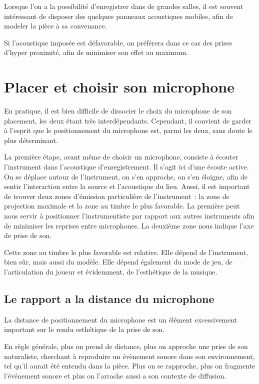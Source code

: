 \documentclass[
]{book}
\begin{document}
Lorsque l'on a la possibilité d'enregistrer dans de grandes salles, il est souvent intéressant de disposer des quelques panneaux acoustiques mobiles, afin de modeler la pièce à sa convenance.

Si l'acoustique imposée est défavorable, on préférera dans ce cas des prises d'hyper proximité, afin de minimiser son effet au maximum.

\hypertarget{placer-et-choisir-son-microphone}{%
\section{Placer et choisir son microphone}\label{placer-et-choisir-son-microphone}}

En pratique, il est bien difficile de dissocier le choix du microphone de son placement, les deux étant très interdépendants. Cependant, il convient de garder à l'esprit que le positionnement du microphone est, parmi les deux, sans doute le plus déterminant.

La première étape, avant même de choisir un microphone, consiste à écouter l'instrument dans l'acoustique d'enregistrement. Il s'agit ici d'une écoute active. On se déplace autour de l'instrument, on s'en approche, on s'en éloigne, afin de sentir l'interaction entre la source et l'acoustique du lieu. Aussi, il est important de trouver deux zones d'émission particulière de l'instrument~: la zone de projection maximale et la zone au timbre le plus favorable. La première peut nous servir à positionner l'instrumentiste par rapport aux autres instruments afin de minimiser les reprises entre microphones. La deuxième zone nous indique l'axe de prise de son.

Cette zone au timbre le plus favorable est relative. Elle dépend de l'instrument, bien sûr, mais aussi du modèle. Elle dépend également du mode de jeu, de l'articulation du joueur et évidemment, de l'esthétique de la musique.

\hypertarget{le-rapport-a-la-distance-du-microphone}{%
\subsection{Le rapport a la distance du microphone}\label{le-rapport-a-la-distance-du-microphone}}

La distance de positionnement du microphone est un élément excessivement important sur le rendu esthétique de la prise de son.

En règle générale, plus on prend de distance, plus on approche une prise de son naturaliste, cherchant à reproduire un évènement sonore dans son environnement, tel qu'il aurait été entendu dans la pièce. Plus on se rapproche, plus on fragmente l'événement sonore et plus on l'arrache aussi a son contexte de diffusion.
\end{document}
